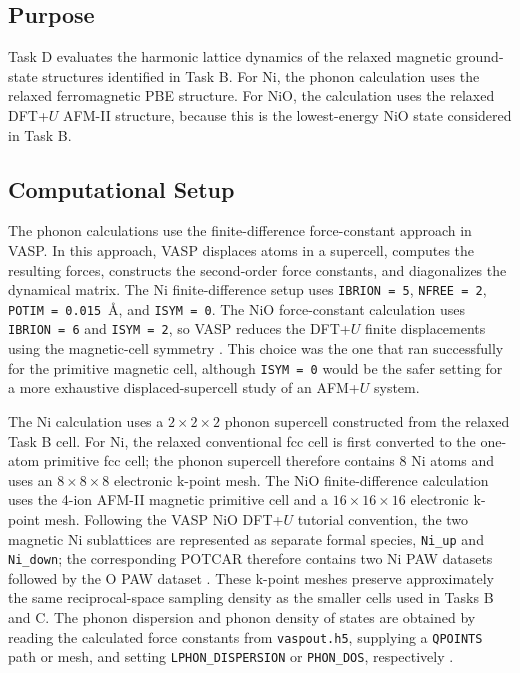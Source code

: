 \subsection{Purpose}

Task D evaluates the harmonic lattice dynamics of the relaxed magnetic
ground-state structures identified in Task B.  For Ni, the phonon calculation
uses the relaxed ferromagnetic PBE structure.  For NiO, the calculation uses
the relaxed DFT+\(U\) AFM-II structure, because this is the lowest-energy NiO
state considered in Task B.

\subsection{Computational Setup}

The phonon calculations use the finite-difference force-constant approach in
VASP.  In this approach, VASP displaces atoms in a supercell, computes the
resulting forces, constructs the second-order force constants, and diagonalizes
the dynamical matrix.  The Ni finite-difference setup uses \texttt{IBRION = 5},
\texttt{NFREE = 2}, \texttt{POTIM = 0.015}~\AA, and \texttt{ISYM = 0}.  The NiO
force-constant calculation uses \texttt{IBRION = 6} and \texttt{ISYM = 2}, so
VASP reduces the DFT+\(U\) finite displacements using the magnetic-cell
symmetry \cite{vasp-phonon-fd}.  This choice was the one that ran successfully
for the primitive magnetic cell, although \texttt{ISYM = 0} would be the safer
setting for a more exhaustive displaced-supercell study of an AFM+\(U\) system.

The Ni calculation uses a \(2\times2\times2\) phonon supercell constructed from
the relaxed Task B cell.  For Ni, the relaxed conventional fcc cell is first
converted to the one-atom primitive fcc cell; the phonon supercell therefore
contains 8 Ni atoms and uses an \(8\times8\times8\) electronic k-point mesh.  The
NiO finite-difference calculation uses the 4-ion AFM-II magnetic primitive cell
and a \(16\times16\times16\) electronic k-point mesh.
Following the VASP NiO DFT+\(U\) tutorial convention, the two magnetic Ni
sublattices are represented as separate formal species, \texttt{Ni\_up} and
\texttt{Ni\_down}; the corresponding POTCAR therefore contains two Ni PAW
datasets followed by the O PAW dataset \cite{vasp-nio-u}.
These k-point meshes preserve approximately the same reciprocal-space sampling
density as the smaller cells used in Tasks B and C.  The phonon dispersion and
phonon density of states are obtained by reading the calculated force constants
from \texttt{vaspout.h5}, supplying a \texttt{QPOINTS} path or mesh, and setting
\texttt{LPHON\_DISPERSION} or \texttt{PHON\_DOS}, respectively
\cite{vasp-phonon-dispersion}.

